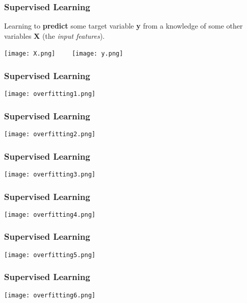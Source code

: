 \documentclass[t]{beamer}
\newcommand\df{\bf\color{Maroon}}
\begin{document}
\begin{frame}
  \frametitle{Supervised Learning}
  Learning to {\df predict} some target variable {\df\large y} from a
  knowledge of some other variables {\df \large X} (the {\it input features}).
  \begin{center}
    \texttt{[image: X.png]}\mbox{~~~~}
    \texttt{[image: y.png]}
  \end{center}
\end{frame}

\begin{frame}
  \frametitle{Supervised Learning}
   \begin{center}
    \texttt{[image: overfitting1.png]}
   \end{center}
\end{frame}

\begin{frame}
  \frametitle{Supervised Learning}
   \begin{center}
    \texttt{[image: overfitting2.png]}
   \end{center}
\end{frame}

\begin{frame}
  \frametitle{Supervised Learning}
   \begin{center}
    \texttt{[image: overfitting3.png]}
   \end{center}
\end{frame}

\begin{frame}
  \frametitle{Supervised Learning}
   \begin{center}
    \texttt{[image: overfitting4.png]}
   \end{center}
\end{frame}

\begin{frame}
  \frametitle{Supervised Learning}
   \begin{center}
    \texttt{[image: overfitting5.png]}
   \end{center}
\end{frame}

\begin{frame}
  \frametitle{Supervised Learning}
   \begin{center}
    \texttt{[image: overfitting6.png]}
   \end{center}
 \end{frame}
\end{document}
